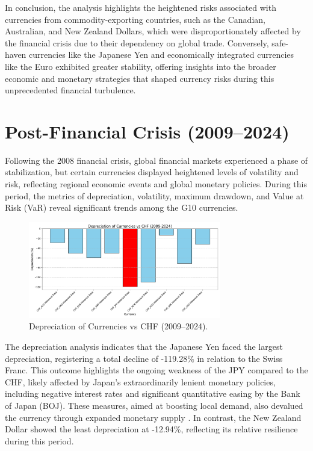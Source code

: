 \documentclass[11pt,a4paper,english,oneside]{book}
\begin{document}
In conclusion, the analysis highlights the heightened risks associated with currencies from commodity-exporting countries, such as the Canadian, Australian, and New Zealand Dollars, which were disproportionately affected by the financial crisis due to their dependency on global trade. Conversely, safe-haven currencies like the Japanese Yen and economically integrated currencies like the Euro exhibited greater stability, offering insights into the broader economic and monetary strategies that shaped currency risks during this unprecedented financial turbulence.

\section{Post-Financial Crisis (2009–2024)}
Following the 2008 financial crisis, global financial markets experienced a phase of stabilization, but certain currencies displayed heightened levels of volatility and risk, reflecting regional economic events and global monetary policies. During this period, the metrics of depreciation, volatility, maximum drawdown, and Value at Risk (VaR) reveal significant trends among the G10 currencies.

\begin{figure}[h!]
    \centering
    \includegraphics[width=0.75\textwidth]{../../images/depreciation_2009_2024.pdf}
    \caption{Depreciation of Currencies vs CHF (2009--2024).}
    \label{fig:depreciation_2009_2024}
\end{figure}

The depreciation analysis indicates that the Japanese Yen faced the largest depreciation, registering a total decline of -119.28\% in relation to the Swiss Franc. This outcome highlights the ongoing weakness of the JPY compared to the CHF, likely affected by Japan's extraordinarily lenient monetary policies, including negative interest rates and significant quantitative easing by the Bank of Japan (BOJ). These measures, aimed at boosting local demand, also devalued the currency through expanded monetary supply \parencite{shirai2020bank}. In contrast, the New Zealand Dollar showed the least depreciation at -12.94\%, reflecting its relative resilience during this period.
\end{document}
